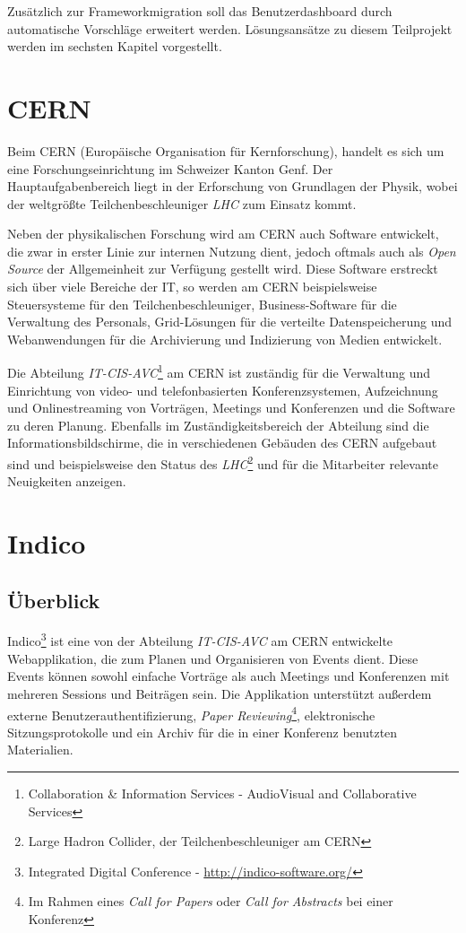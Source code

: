 Zusätzlich zur Frameworkmigration soll das Benutzerdashboard durch automatische Vorschläge erweitert
werden. Lösungsansätze zu diesem Teilprojekt werden im sechsten Kapitel vorgestellt.



\section{CERN}

Beim CERN (Europäische Organisation für Kernforschung), handelt es sich um eine
Forschungseinrichtung im Schweizer Kanton Genf. Der Hauptaufgabenbereich liegt in der Erforschung
von Grundlagen der Physik, wobei der weltgrößte Teilchenbeschleuniger \emph{LHC} zum Einsatz kommt.

Neben der physikalischen Forschung wird am CERN auch Software entwickelt, die zwar in erster Linie
zur internen Nutzung dient, jedoch oftmals auch als \emph{Open Source} der Allgemeinheit zur Verfügung
gestellt wird. Diese Software erstreckt sich über viele Bereiche der IT, so werden am CERN
beispielsweise Steuersysteme für den Teilchenbeschleuniger, Business-Software für die Verwaltung des
Personals, Grid-Lösungen für die verteilte Datenspeicherung und Webanwendungen für die Archivierung
und Indizierung von Medien entwickelt.

Die Abteilung \emph{IT-CIS-AVC}\footnote{Collaboration \& Information Services - AudioVisual and
Collaborative Services} am CERN ist zuständig für die Verwaltung und Einrichtung von video- und
telefonbasierten Konferenzsystemen, Aufzeichnung und Onlinestreaming von Vorträgen, Meetings und
Konferenzen und die Software zu deren Planung. Ebenfalls im Zuständigkeitsbereich der Abteilung sind
die Informationsbildschirme, die in verschiedenen Gebäuden des CERN aufgebaut sind und beispielsweise
den Status des \emph{LHC}\footnote{Large Hadron Collider, der Teilchenbeschleuniger am CERN} und
für die Mitarbeiter relevante Neuigkeiten anzeigen.


\section{Indico}

\subsection{Überblick}
Indico\footnote{Integrated Digital Conference - \href{http://indico-software.org/}{http://indico-software.org/}}
ist eine von der Abteilung \emph{IT-CIS-AVC} am CERN entwickelte Webapplikation, die zum Planen und
Organisieren von Events dient. Diese Events können sowohl einfache Vorträge als auch Meetings und
Konferenzen mit mehreren Sessions und Beiträgen sein. Die Applikation unterstützt außerdem externe
Benutzerauthentifizierung, \emph{Paper Reviewing}\footnote{Im Rahmen eines \emph{Call for Papers}
oder \emph{Call for Abstracts} bei einer Konferenz}, elektronische Sitzungsprotokolle und ein Archiv
für die in einer Konferenz benutzten Materialien. \citep{indico}

